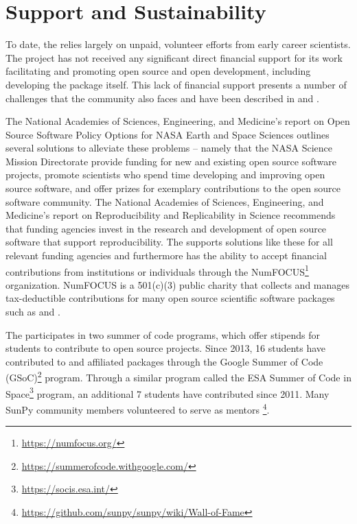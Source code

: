 \section{Support and Sustainability}
\label{sec:support}

To date, the \sunpyproj relies largely on unpaid, volunteer efforts from early career scientists.
The project has not received any significant direct financial support for its work facilitating and promoting open source and open development, including developing the \sunpypkg package itself.
This lack of financial support presents a number of challenges that the \astropy community also faces and have been described in \cite{PriceWhelan:2018ji} and \cite{Muna2016}.

The National Academies of Sciences, Engineering, and Medicine's report on Open Source Software Policy Options for NASA Earth and Space Sciences \citep{NAP2018} outlines several solutions to alleviate these problems -- namely that the NASA Science Mission Directorate provide funding for new and existing open source software projects, promote scientists who spend time developing and improving open source software, and offer prizes for exemplary contributions to the open source software community.
The National Academies of Sciences, Engineering, and Medicine's report on Reproducibility and Replicability in Science \citep{NAP2019} recommends that funding agencies invest in the research and development of open source software that support reproducibility.
The \sunpyproj supports solutions like these for all relevant funding agencies and furthermore has the ability to accept financial contributions from institutions or individuals through the NumFOCUS\footnote{\url{https://numfocus.org/}} organization. NumFOCUS is a 501(c)(3) public charity that collects and manages tax-deductible contributions for many open source scientific software packages such as \numpy and \astropy.

The \sunpyproj participates in two summer of code programs, which offer stipends for students to contribute to open source projects.
Since 2013, 16 students have contributed to \sunpypkg and affiliated packages through the Google Summer of Code (GSoC)\footnote{\url{https://summerofcode.withgoogle.com/}} program.
Through a similar program called the ESA Summer of Code in Space\footnote{\url{https://socis.esa.int/}} program, an additional 7 students have contributed since 2011.
Many SunPy community members volunteered to serve as mentors \footnote{\url{https://github.com/sunpy/sunpy/wiki/Wall-of-Fame}}.
